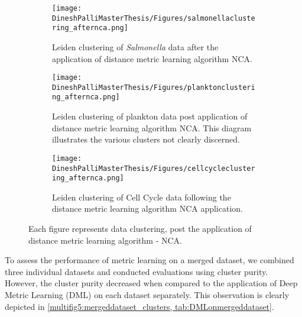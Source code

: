 \documentclass[12pt,a4paper]{article}
\begin{document}
\begin{figure}
  \centering
  \begin{subfigure}{\linewidth}
    \texttt{[image: DineshPalliMasterThesis/Figures/salmonellaclustering\_afternca.png]}
    \caption{Leiden clustering of \textit{Salmonella} data after the application of distance metric learning algorithm NCA.}
    \label{multifig4:image_a}
  \end{subfigure}
  \hfill
  \begin{subfigure}{\linewidth}
    \texttt{[image: DineshPalliMasterThesis/Figures/planktonclustering\_afternca.png]}
    \caption{Leiden clustering of plankton data post application of distance metric learning algorithm NCA. This diagram illustrates the various clusters not clearly discerned.}
    \label{multifig4:image_b}
  \end{subfigure}
  \hfill
  \begin{subfigure}{\linewidth}
    \texttt{[image: DineshPalliMasterThesis/Figures/cellcycleclustering\_afternca.png]}
    \caption{Leiden clustering of Cell Cycle data following the distance metric learning algorithm NCA application.}
    \label{multifig4:image_c}
  \end{subfigure}
  \caption{Each figure represents data clustering, post the application of distance metric learning algorithm - NCA.}
  \label{multifig4:DML_Clusters}
\end{figure}


To assess the performance of metric learning on a merged dataset, we combined three individual datasets and conducted evaluations using cluster purity. However, the cluster purity decreased when compared to the application of Deep Metric Learning (DML) on each dataset separately. This observation is clearly depicted in \ref{multifig5:mergeddataset_clusters, tab:DMLonmergeddataset}.
\end{document}
